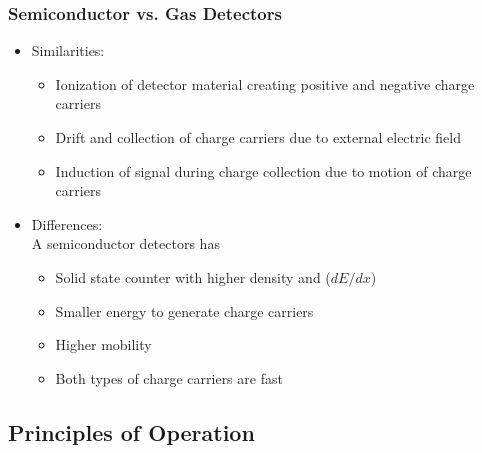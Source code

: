 \subsubsection{Semiconductor vs. Gas Detectors}
\begin{itemize}
    \item Similarities:
    \begin{itemize}
        \item Ionization of detector material creating positive and negative charge carriers 
        \item Drift and collection of charge carriers due to external electric field
        \item Induction of signal during charge collection due to motion of charge carriers
    \end{itemize}
    \item Differences:\\
    A semiconductor detectors has
    \begin{itemize}
        \item Solid state counter with higher density and ($dE/dx$)
        \item Smaller energy to generate charge carriers
        \item Higher mobility
        \item Both types of charge carriers are fast
    \end{itemize}
\end{itemize}
\subsection{Principles of Operation}
